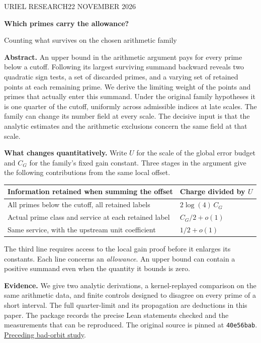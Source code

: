\documentclass[12pt,letterpaper]{article}
\newcommand{\para}[1]{\par\medskip\noindent\textbf{#1}\quad}
\begin{document}
\thispagestyle{plain}
{\sffamily\small\color{accent}URIEL RESEARCH\hfill 22 NOVEMBER 2026}\par\vspace{14pt}
{\Huge\bfseries\color{ink}Which primes carry the allowance?\par}\vspace{5pt}
{\Large\color{muted}Counting what survives on the chosen arithmetic family}\par\bigskip

\textbf{Abstract.} An upper bound in the arithmetic argument pays for every prime below a cutoff. Following its largest surviving summand backward reveals two quadratic sign tests, a set of discarded primes, and a varying set of retained points at each remaining prime. We derive the limiting weight of the points and primes that actually enter this summand. Under the original family hypotheses it is one quarter of the cutoff, uniformly across admissible indices at late scales. The family can change its number field at every scale. The decisive input is that the analytic estimates and the arithmetic exclusions concern the same field at that scale.

\para{What changes quantitatively.} Write \(U\) for the scale of the global error budget and \(C_G\) for the family's fixed gain constant. Three stages in the argument give the following contributions from the same local offset.
\begin{center}\begin{tabularx}{.96\linewidth}{@{}Yl@{}}
\toprule
Information retained when summing the offset & Charge divided by \(U\)\\\midrule
All primes below the cutoff, all retained labels & \(2\log(4)\,C_G\)\\
Actual prime class and service at each retained label & \(C_G/2+o(1)\)\\
Same service, with the upstream unit coefficient & \(1/2+o(1)\)\\\bottomrule
\end{tabularx}\end{center}
The third line requires access to the local gain proof before it enlarges its constants. Each line concerns an \emph{allowance}. An upper bound can contain a positive summand even when the quantity it bounds is zero.

\para{Evidence.} We give two analytic derivations, a kernel-replayed comparison on the same arithmetic data, and finite controls designed to disagree on every prime of a short interval. The full quarter-limit and its propagation are deductions in this paper. The package records the precise Lean statements checked and the measurements that can be reproduced. The original source is pinned at \texttt{40e56bab}. \href{https://github.com/nousentllc/riemann-hypothesis/pull/8}{Preceding bad-orbit study}.
\end{document}
